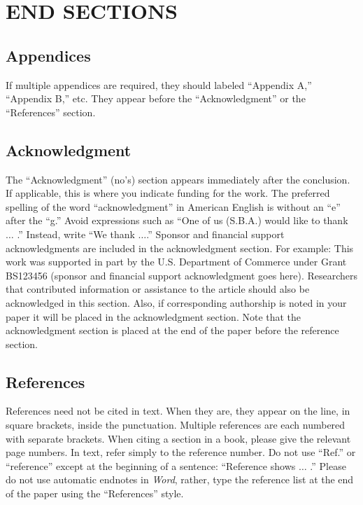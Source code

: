 \documentclass{IEEEcsmag}
\begin{document}
\section{END SECTIONS}

\subsection{Appendices}

If multiple appendices are required, they should labeled ``Appendix A,'' ``Appendix B,'' etc. They appear before the ``Acknowledgment'' or the ``References'' section.

\subsection{Acknowledgment}

The ``Acknowledgment'' (no's) section appears immediately after the conclusion. If applicable, this is where you indicate funding for the work. The preferred spelling of the word ``acknowledgment'' in American English is without an ``e'' after the ``g.'' Avoid expressions such as ``One of us (S.B.A.) would like to thank $\ldots$ .'' Instead, write ``We thank $\ldots$.'' Sponsor and financial support acknowledgments are included in the acknowledgment section. For example: This work was supported in part by the U.S. Department of Commerce under Grant BS123456 (sponsor and financial support acknowledgment goes here). Researchers that contributed information or assistance to the article should also be acknowledged in this section. Also, if corresponding authorship is noted in your paper it will be placed in the acknowledgment section. Note that the acknowledgment section is placed at the end of the paper before the reference section.

\subsection{References}


References need not be cited in text. When they are, they appear on the 
line, in square brackets, inside the punctuation. Multiple references are 
each numbered with separate brackets. When citing a section in a book, 
please give the relevant page numbers. In text, refer simply to the 
reference number. Do not use ``Ref.'' or ``reference'' except at the 
beginning of a sentence: ``Reference \cite{CC1} shows $\ldots$ .'' Please do not use 
automatic endnotes in \emph{Word}, rather, type the reference list at the end of the 
paper using the ``References'' style.
\end{document}
